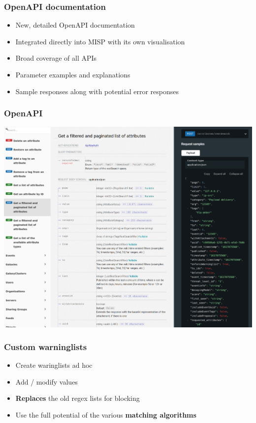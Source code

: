 \begin{frame}
\frametitle{OpenAPI documentation}
\begin{itemize}
	\item New, detailed OpenAPI documentation
        \item Integrated directly into MISP with its own visualisation
        \item Broad coverage of all APIs
        \item Parameter examples and explanations
        \item Sample responses along with potential error responses
\end{itemize}
\end{frame}

\begin{frame}
\frametitle{OpenAPI}
\includegraphics[scale=0.18]{images/openapi.png}
\end{frame}

\begin{frame}
\frametitle{Custom warninglists}
\begin{itemize}
	\item Create waringlists ad hoc
        \item Add / modify values
        \item {\bf Replaces} the old regex lists for blocking
        \item Use the full potential of the various {\bf matching algorithms}
\end{itemize}
\end{frame}

